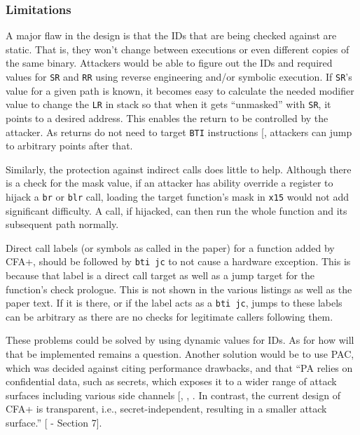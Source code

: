 \documentclass[a4paper, nobind]{templates/ociamthesis}
\begin{document}
\subsubsection{Limitations}\label{cfaplus-limitations}

A major flaw in the design is that the IDs that are being checked against are static.
That is, they won't change between executions or even different copies of the same binary.
Attackers would be able to figure out the IDs and required values for \texttt{SR} and \texttt{RR} using
reverse engineering and/or symbolic execution. If \texttt{SR}'s value for a given path
is known, it becomes easy to calculate the needed modifier value to change the
\texttt{LR} in stack so that when it gets ``unmasked'' with \texttt{SR}, it points to a desired address.
This enables the return to be controlled by the attacker. As returns do not need to
target \texttt{BTI} instructions {[}\citeproc{ref-arm-pacbti}{9}{]}, attackers can jump to arbitrary points after that.

Similarly, the protection against indirect calls does little to help. Although
there is a check for the mask value, if an attacker has ability override a register to
hijack a \texttt{br} or \texttt{blr} call, loading the target function's mask in \texttt{x15} would not
add significant difficulty. A call, if hijacked, can then run the whole function
and its subsequent path normally.

Direct call labels (or symbols as called in the paper) for a function added by CFA+,
should be followed by \texttt{bti\ jc} to not cause a hardware exception.
This is because that label is a direct call target as well as a jump target for
the function's check prologue. This is not shown in the various listings as well as the paper text.
If it is there, or if the label acts as a \texttt{bti\ jc}, jumps to these labels can be
arbitrary as there are no checks for legitimate callers following them.

These problems could be solved by using dynamic values for IDs. As for how will that
be implemented remains a question. Another solution would be to use PAC, which
was decided against citing performance drawbacks, and that ``PA relies on confidential
data, such as secrets, which exposes it to a wider range of attack surfaces including
various side channels {[}, , \citeproc{ref-ravichandran2022pacman}{46}{]}.
In contrast, the current design of CFA+ is transparent, i.e.,
secret-independent, resulting in a smaller attack surface.'' {[} - Section 7{]}.
\end{document}
